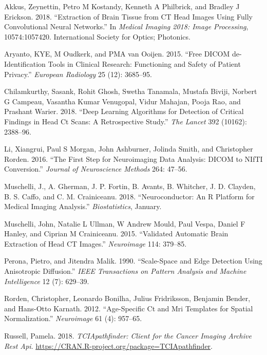 \documentclass[]{elsarticle} %
\begin{document}
\hypertarget{refs}{}
\leavevmode\hypertarget{ref-ct_bet}{}%
Akkus, Zeynettin, Petro M Kostandy, Kenneth A Philbrick, and Bradley J Erickson. 2018. ``Extraction of Brain Tissue from CT Head Images Using Fully Convolutional Neural Networks.'' In \emph{Medical Imaging 2018: Image Processing}, 10574:1057420. International Society for Optics; Photonics.

\leavevmode\hypertarget{ref-aryanto2015free}{}%
Aryanto, KYE, M Oudkerk, and PMA van Ooijen. 2015. ``Free DICOM de-Identification Tools in Clinical Research: Functioning and Safety of Patient Privacy.'' \emph{European Radiology} 25 (12): 3685--95.

\leavevmode\hypertarget{ref-cq500}{}%
Chilamkurthy, Sasank, Rohit Ghosh, Swetha Tanamala, Mustafa Biviji, Norbert G Campeau, Vasantha Kumar Venugopal, Vidur Mahajan, Pooja Rao, and Prashant Warier. 2018. ``Deep Learning Algorithms for Detection of Critical Findings in Head Ct Scans: A Retrospective Study.'' \emph{The Lancet} 392 (10162): 2388--96.

\leavevmode\hypertarget{ref-dcm2niix}{}%
Li, Xiangrui, Paul S Morgan, John Ashburner, Jolinda Smith, and Christopher Rorden. 2016. ``The First Step for Neuroimaging Data Analysis: DICOM to NIfTI Conversion.'' \emph{Journal of Neuroscience Methods} 264: 47--56.

\leavevmode\hypertarget{ref-neuroconductor}{}%
Muschelli, J., A. Gherman, J. P. Fortin, B. Avants, B. Whitcher, J. D. Clayden, B. S. Caffo, and C. M. Crainiceanu. 2018. ``Neuroconductor: An R Platform for Medical Imaging Analysis.'' \emph{Biostatistics}, January.

\leavevmode\hypertarget{ref-ctbet}{}%
Muschelli, John, Natalie L Ullman, W Andrew Mould, Paul Vespa, Daniel F Hanley, and Ciprian M Crainiceanu. 2015. ``Validated Automatic Brain Extraction of Head CT Images.'' \emph{Neuroimage} 114: 379--85.

\leavevmode\hypertarget{ref-peronamalik}{}%
Perona, Pietro, and Jitendra Malik. 1990. ``Scale-Space and Edge Detection Using Anisotropic Diffusion.'' \emph{IEEE Transactions on Pattern Analysis and Machine Intelligence} 12 (7): 629--39.

\leavevmode\hypertarget{ref-rorden2012age}{}%
Rorden, Christopher, Leonardo Bonilha, Julius Fridriksson, Benjamin Bender, and Hans-Otto Karnath. 2012. ``Age-Specific Ct and Mri Templates for Spatial Normalization.'' \emph{Neuroimage} 61 (4): 957--65.

\leavevmode\hypertarget{ref-TCIApathfinder}{}%
Russell, Pamela. 2018. \emph{TCIApathfinder: Client for the Cancer Imaging Archive Rest Api}. \url{https://CRAN.R-project.org/package=TCIApathfinder}.
\end{document}

